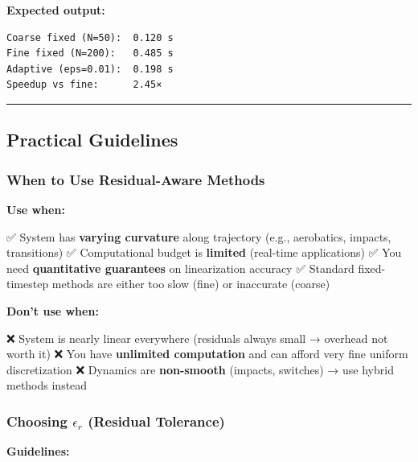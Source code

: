 \documentclass[
  letterpaper,
  DIV=11,
  numbers=noendperiod]{scrartcl}
\begin{document}
\textbf{Expected output:}

\begin{verbatim}
Coarse fixed (N=50):  0.120 s
Fine fixed (N=200):   0.485 s
Adaptive (eps=0.01):  0.198 s
Speedup vs fine:      2.45×
\end{verbatim}

\begin{center}\rule{0.5\linewidth}{0.5pt}\end{center}

\subsection{Practical Guidelines}\label{sec-guidelines}

\subsubsection{When to Use Residual-Aware
Methods}\label{when-to-use-residual-aware-methods}

\textbf{Use when:}

✅ System has \textbf{varying curvature} along trajectory (e.g.,
aerobatics, impacts, transitions) ✅ Computational budget is
\textbf{limited} (real-time applications) ✅ You need
\textbf{quantitative guarantees} on linearization accuracy ✅ Standard
fixed-timestep methods are either too slow (fine) or inaccurate (coarse)

\textbf{Don't use when:}

❌ System is nearly linear everywhere (residuals always small → overhead
not worth it) ❌ You have \textbf{unlimited computation} and can afford
very fine uniform discretization ❌ Dynamics are \textbf{non-smooth}
(impacts, switches) → use hybrid methods instead

\subsubsection{\texorpdfstring{Choosing \(\epsilon_r\) (Residual
Tolerance)}{Choosing \textbackslash epsilon\_r (Residual Tolerance)}}\label{choosing-epsilon_r-residual-tolerance}

\textbf{Guidelines:}
\end{document}
